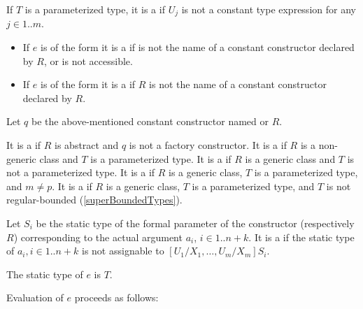\documentclass[makeidx]{article}
\begin{document}
{\LMHash{}%
If $T$ is a parameterized type,
it is a
 if $U_j$ is not a constant type expression for any
$j \in 1 .. m$.

\begin{itemize}
\item
  If $e$ is of the form
  it is a  if  is not the name of
  a constant constructor declared by $R$, or \id{} is not accessible.
\item
  If $e$ is of the form
  it is a  if $R$ is not the name of
  a constant constructor declared by $R$.
\end{itemize}

\LMHash{}%
Let $q$ be the above-mentioned constant constructor named  or $R$.

\LMHash{}%
It is a  if $R$ is abstract
and $q$ is not a factory constructor.
It is a  if $R$ is a non-generic class
and $T$ is a parameterized type.
It is a  if $R$ is a generic class
and $T$ is not a parameterized type.
It is a  if $R$ is a generic class,
$T$ is a parameterized type, and $m \not= p$.
It is a  if $R$ is a generic class,
$T$ is a parameterized type,
and $T$ is not regular-bounded
(\ref{superBoundedTypes}).

\LMHash{}%
Let $S_i$ be the static type of
the formal parameter of the constructor  (respectively $R$)
corresponding to the actual argument $a_i$, $i \in 1 .. n+k$.
It is a  if the static type of
$a_i, i \in 1 .. n + k$
is not assignable to $[U_1/X_1, \ldots, U_m/X_m]S_i$.

\LMHash{}%
The static type of $e$ is $T$.

\LMHash{}%
Evaluation of $e$ proceeds as follows:

}
\end{document}
